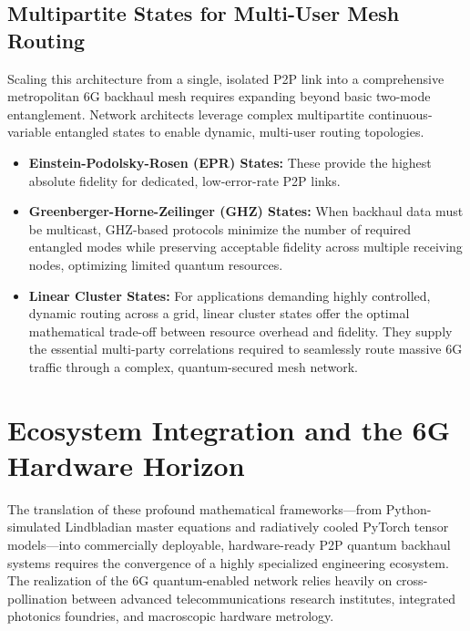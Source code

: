 \documentclass[11pt,a4paper]{article}
\begin{document}
\subsection{Multipartite States for Multi-User Mesh Routing}

Scaling this architecture from a single, isolated P2P link into a comprehensive metropolitan 6G backhaul mesh requires expanding beyond basic two-mode entanglement. Network architects leverage complex multipartite continuous-variable entangled states to enable dynamic, multi-user routing topologies.\cite{ref57}

\begin{itemize}
\item \textbf{Einstein-Podolsky-Rosen (EPR) States:} These provide the highest absolute fidelity for dedicated, low-error-rate P2P links.\cite{ref57}
\item \textbf{Greenberger-Horne-Zeilinger (GHZ) States:} When backhaul data must be multicast, GHZ-based protocols minimize the number of required entangled modes while preserving acceptable fidelity across multiple receiving nodes, optimizing limited quantum resources.\cite{ref57}
\item \textbf{Linear Cluster States:} For applications demanding highly controlled, dynamic routing across a grid, linear cluster states offer the optimal mathematical trade-off between resource overhead and fidelity.\cite{ref57} They supply the essential multi-party correlations required to seamlessly route massive 6G traffic through a complex, quantum-secured mesh network.\cite{ref19}
\end{itemize}

\section{Ecosystem Integration and the 6G Hardware Horizon}

The translation of these profound mathematical frameworks---from Python-simulated Lindbladian master equations and radiatively cooled PyTorch tensor models---into commercially deployable, hardware-ready P2P quantum backhaul systems requires the convergence of a highly specialized engineering ecosystem.\cite{ref6} The realization of the 6G quantum-enabled network relies heavily on cross-pollination between advanced telecommunications research institutes, integrated photonics foundries, and macroscopic hardware metrology.\cite{ref6}
\end{document}
